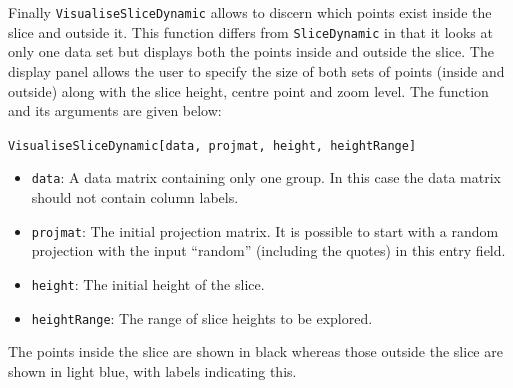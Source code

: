 \documentclass[]{interact}
\theoremstyle{plain}%
\theoremstyle{definition}
\theoremstyle{remark}
\providecommand{\tightlist}{%
  \setlength{\itemsep}{0pt}\setlength{\parskip}{0pt}}
\def\tightlist{}
\begin{document}
Finally \texttt{VisualiseSliceDynamic} allows to discern which points
exist inside the slice and outside it. This function differs from
\texttt{SliceDynamic} in that it looks at only one data set but displays
both the points inside and outside the slice. The display panel allows
the user to specify the size of both sets of points (inside and outside)
along with the slice height, centre point and zoom level. The function
and its arguments are given below:

\texttt{VisualiseSliceDynamic{[}data,\ projmat,\ height,\ heightRange{]}}

\begin{itemize}
\tightlist
\item
  \texttt{data}: A data matrix containing only one group. In this case
  the data matrix should not contain column labels.
\item
  \texttt{projmat}: The initial projection matrix. It is possible to
  start with a random projection with the input ``random'' (including
  the quotes) in this entry field.
\item
  \texttt{height}: The initial height of the slice.
\item
  \texttt{heightRange}: The range of slice heights to be explored.
\end{itemize}

The points inside the slice are shown in black whereas those outside the
slice are shown in light blue, with labels indicating this.



\end{document}
